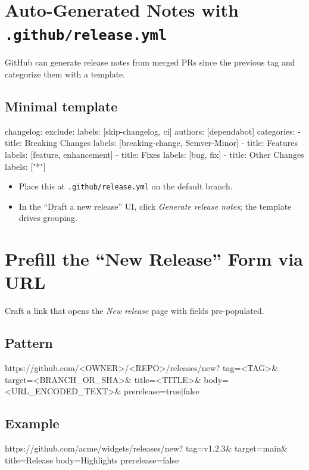 \documentclass[11pt]{article}
\newcommand{\file}[1]{\texttt{#1}}
\begin{document}
\section{Auto-Generated Notes with \file{.github/release.yml}}
GitHub can generate release notes from merged PRs since the previous tag and categorize them with a template.

\subsection*{Minimal template}
\begin{yamlcode}
changelog:
  exclude:
    labels: [skip-changelog, ci]
    authors: [dependabot]
  categories:
    - title: Breaking Changes
      labels: [breaking-change, Semver-Minor]
    - title: Features
      labels: [feature, enhancement]
    - title: Fixes
      labels: [bug, fix]
    - title: Other Changes
      labels: ["*"]
\end{yamlcode}

\begin{itemize}
  \item Place this at \file{.github/release.yml} on the default branch.
  \item In the ``Draft a new release'' UI, click \emph{Generate release notes}; the template drives grouping.
\end{itemize}

\section{Prefill the ``New Release'' Form via URL}
Craft a link that opens the \emph{New release} page with fields pre-populated.

\subsection*{Pattern}
\begin{textcode}
https://github.com/<OWNER>/<REPO>/releases/new?
  tag=<TAG>&
  target=<BRANCH_OR_SHA>&
  title=<TITLE>&
  body=<URL_ENCODED_TEXT>&
  prerelease=true|false
\end{textcode}

\subsection*{Example}
\begin{textcode}
https://github.com/acme/widgets/releases/new?
tag=v1.2.3&
target=main&
title=Release%
body=Highlights%
prerelease=false
\end{textcode}
\end{document}
